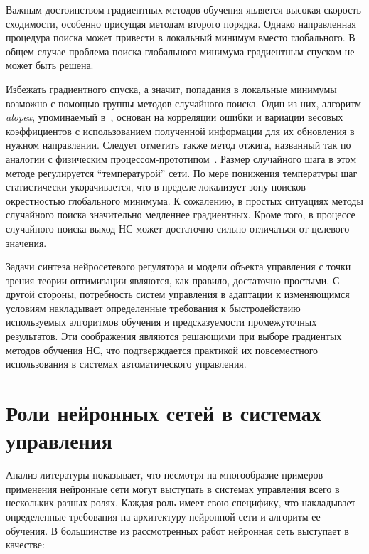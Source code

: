 Важным достоинством градиентных методов обучения является высокая
скорость сходимости, особенно присущая методам второго порядка.
Однако направленная процедура поиска может привести в локальный
минимум вместо глобального.  В общем случае проблема поиска
глобального минимума градиентным спуском не может быть решена.

Избежать градиентного спуска, а значит, попадания в локальные минимумы
возможно с помощью группы методов случайного поиска.  Один из них,
алгоритм {\it alopex}, упоминаемый в~\cite{boquete99}, основан на
корреляции ошибки и вариации весовых коэффициентов с использованием
полученной информации для их обновления в нужном направлении.  Следует
отметить также метод отжига, названный так по аналогии с физическим
процессом-прототипом~\cite{wasser92}.  Размер случайного шага в этом
методе регулируется ``температурой'' сети.  По мере понижения
температуры шаг статистически укорачивается, что в пределе локализует
зону поисков окрестностью глобального минимума.  К сожалению, в
простых ситуациях методы случайного поиска значительно медленнее
градиентных.  Кроме того, в процессе случайного поиска выход НС может
достаточно сильно отличаться от целевого значения.

Задачи синтеза нейросетевого регулятора и модели объекта управления с
точки зрения теории оптимизации являются, как правило, достаточно
простыми.  С другой стороны, потребность систем управления в адаптации
к изменяющимся условиям накладывает определенные требования к
быстродействию используемых алгоритмов обучения и предсказуемости
промежуточных результатов.  Эти соображения являются решающими при
выборе градиентых методов обучения НС, что подтверждается практикой их
повсеместного использования в системах автоматического управления.

\section{Роли нейронных сетей в системах управления}

Анализ литературы показывает, что несмотря на многообразие примеров
применения нейронные сети могут выступать в системах управления всего
в нескольких разных ролях.  Каждая роль имеет свою специфику, что
накладывает определенные требования на архитектуру нейронной сети и
алгоритм ее обучения.  В большинстве из рассмотренных работ нейронная
сеть выступает в качестве:

